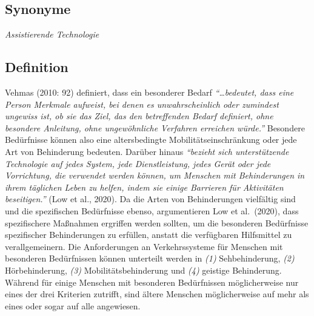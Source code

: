 \documentclass[
]{book}
\begin{document}
\hypertarget{synonyme-21}{%
\subsection*{Synonyme}\label{synonyme-21}}

\emph{Assistierende Technologie}

\hypertarget{definition-27}{%
\subsection*{Definition}\label{definition-27}}

Vehmas (2010: 92) definiert, dass ein besonderer Bedarf \emph{``\ldots bedeutet, dass eine Person Merkmale aufweist, bei denen es unwahrscheinlich oder zumindest ungewiss ist, ob sie das Ziel, das den betreffenden Bedarf definiert, ohne besondere Anleitung, ohne ungewöhnliche Verfahren erreichen würde.''} Besondere Bedürfnisse können also eine altersbedingte Mobilitätseinschränkung oder jede Art von Behinderung bedeuten.
Darüber hinaus \emph{``bezieht sich unterstützende Technologie auf jedes System, jede Dienstleistung, jedes Gerät oder jede Vorrichtung, die verwendet werden können, um Menschen mit Behinderungen in ihrem täglichen Leben zu helfen, indem sie einige Barrieren für Aktivitäten beseitigen.''} (Low et al., 2020).
Da die Arten von Behinderungen vielfältig sind und die spezifischen Bedürfnisse ebenso, argumentieren Low et al.~(2020), dass spezifischere Maßnahmen ergriffen werden sollten, um die besonderen Bedürfnisse spezifischer Behinderungen zu erfüllen, anstatt die verfügbaren Hilfsmittel zu verallgemeinern. Die Anforderungen an Verkehrssysteme für Menschen mit besonderen Bedürfnissen können unterteilt werden in \emph{(1)} Sehbehinderung, \emph{(2)} Hörbehinderung, \emph{(3)} Mobilitätsbehinderung und \emph{(4)} geistige Behinderung. Während für einige Menschen mit besonderen Bedürfnissen möglicherweise nur eines der drei Kriterien zutrifft, sind ältere Menschen möglicherweise auf mehr als eines oder sogar auf alle angewiesen.
\end{document}
